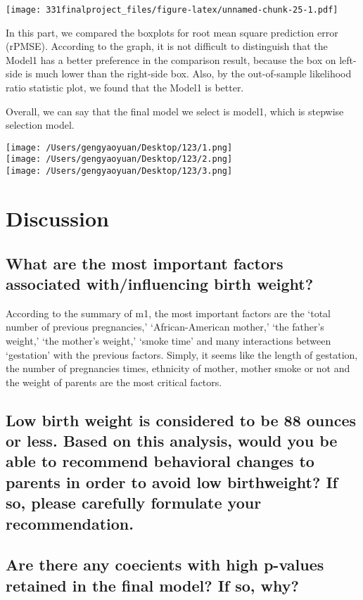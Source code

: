 \documentclass[]{article}
\begin{document}
\texttt{[image: 331finalproject\_files/figure-latex/unnamed-chunk-25-1.pdf]}

In this part, we compared the boxplots for root mean square prediction
error (rPMSE). According to the graph, it is not difficult to
distinguish that the Model1 has a better preference in the comparison
result, because the box on left-side is much lower than the right-side
box. Also, by the out-of-sample likelihood ratio statistic plot, we
found that the Model1 is better.

Overall, we can say that the final model we select is model1, which is
stepwise selection model.

\texttt{[image: /Users/gengyaoyuan/Desktop/123/1.png]}\\
\texttt{[image: /Users/gengyaoyuan/Desktop/123/2.png]}\\
\texttt{[image: /Users/gengyaoyuan/Desktop/123/3.png]}

\section{Discussion}\subsection{What are the most important factors associated with/influencing birth weight?}

According to the summary of m1, the most important factors are the
`total number of previous pregnancies,' `African-American mother,' `the
father's weight,' `the mother's weight,' `smoke time' and many
interactions between `gestation' with the previous factors. Simply, it
seems like the length of gestation, the number of pregnancies times,
ethnicity of mother, mother smoke or not and the weight of parents are
the most critical factors.
\subsection{Low birth weight is considered to be 88 ounces or less. Based on this analysis, would you be able to recommend behavioral changes to parents in order to avoid low birthweight? If so, please carefully formulate your recommendation.}

\subsection{Are there any coecients with high p-values retained in the final model? If so, why?}
\end{document}
